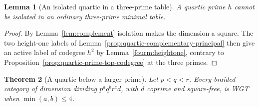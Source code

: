 \documentclass[11pt,a4paper]{article}
\numberwithin{equation}{section}
\newtheorem{theorem}{Theorem}[section]
\newtheorem{lemma}[theorem]{Lemma}
\theoremstyle{remark}
\begin{document}
\begin{lemma}[An isolated quartic in a three-prime table]\label{fam:M:7.2}\label{first:isolate}
A quartic prime $h$ cannot be isolated in an ordinary three-prime
minimal table.
\end{lemma}
\begin{proof}
By Lemma~\ref{lem:complement} isolation makes the dimension a
square. The two height-one labels of
Lemma~\ref{prop:quartic-complementary-principal} then give an active
label of codegree $h^2$ by Lemma~\ref{fourm:heightone}, contrary to
Proposition~\ref{prop:quartic-prime-top-codegree} at the three primes.
\end{proof}

\begin{theorem}[A quartic below a larger prime]\label{fam:M:7.3}\label{seq:smaller-quartic}\label{next:quartic2}\label{thm:first}\label{seq:quartic-any}
Let $p<q<r$. Every braided category of dimension dividing
$p^a q^b r^c d$, with $d$ coprime and square-free, is WGT when
$\min(a,b)\le4$.
\end{theorem}
\end{document}
